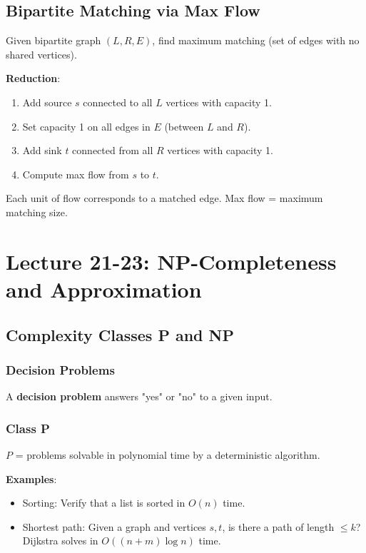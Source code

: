 \documentclass[11pt]{article}
\begin{document}
{{{\subsection*{Bipartite Matching via Max Flow}

Given bipartite graph $(L, R, E)$, find maximum matching (set of edges with no shared vertices).

\textbf{Reduction}:
\begin{enumerate}
\item Add source $s$ connected to all $L$ vertices with capacity 1.
\item Set capacity 1 on all edges in $E$ (between $L$ and $R$).
\item Add sink $t$ connected from all $R$ vertices with capacity 1.
\item Compute max flow from $s$ to $t$.
\end{enumerate}

Each unit of flow corresponds to a matched edge. Max flow = maximum matching size.

\section{Lecture 21-23: NP-Completeness and Approximation}

\subsection*{Complexity Classes P and NP}

\subsubsection*{Decision Problems}
A \textbf{decision problem} answers "yes" or "no" to a given input.

\subsubsection*{Class P}
$P$ = problems solvable in polynomial time by a deterministic algorithm.

\textbf{Examples}:
\begin{itemize}
\item Sorting: Verify that a list is sorted in $O(n)$ time.
\item Shortest path: Given a graph and vertices $s,t$, is there a path of length $\le k$? Dijkstra solves in $O((n+m) \log n)$ time.
\end{itemize}

}}}
\end{document}
